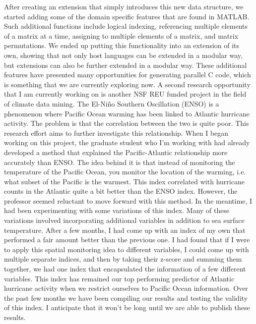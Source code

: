 \documentclass[a4paper,12pt]{article}
\newcommand{\tab}{\hspace*{2em}}
\begin{document}
\tab After creating an extension that simply introduces this new data structure, we started adding some of the domain specific features that are found in MATLAB.  Such additional functions include logical indexing, referencing multiple elements of a matrix at a time, assigning to multiple elements of a matrix, and matrix permutations.  We ended up putting this functionality into an extension of its own, showing that not only host languages can be extended in a modular way, but extensions can also be further extended in a modular way.  These additional features have presented many opportunities for generating parallel C code, which is something that we are currently exploring now.\newline
\tab A second research opportunity that I am currently working on is another NSF REU funded project in the field of climate data mining.  The El-Ni\~{n}o Southern Oscillation (ENSO) is a phenomenon where Pacific Ocean warming has been linked to Atlantic hurricane activity\cite{enso}.  The problem is that the correlation between the two is quite poor.  This research effort aims to further investigate this relationship.  \newline
\tab When I began working on this project, the graduate student who I'm working with had already developed a method that explained the Pacific-Atlantic relationship more accurately than ENSO.  The idea behind it is that instead of monitoring the temperature of the Pacific Ocean, you monitor the location of the warming, i.e. what subset of the Pacific is the warmest.  This index correlated with hurricane counts in the Atlantic quite a bit better than the ENSO index.  However, the professor seemed reluctant to move forward with this method.  In the meantime, I had been experimenting with some variations of this index.  Many of these variations involved incorporating additional variables in addition to sea surface temperature.  After a few months, I had come up with an index of my own that performed a fair amount better than the previous one.  I had found that if I were to apply this spatial monitoring idea to different variables, I could come up with multiple separate indices, and then by taking their z-score and summing them together, we had one index that encapsulated the information of a few different variables.  This index has remained our top performing predictor of Atlantic hurricane activity when we restrict ourselves to Pacific Ocean information.  Over the past few months we have been compiling our results and testing the validity of this index.  I anticipate that it won't be long until we are able to publish these results.
\end{document}
